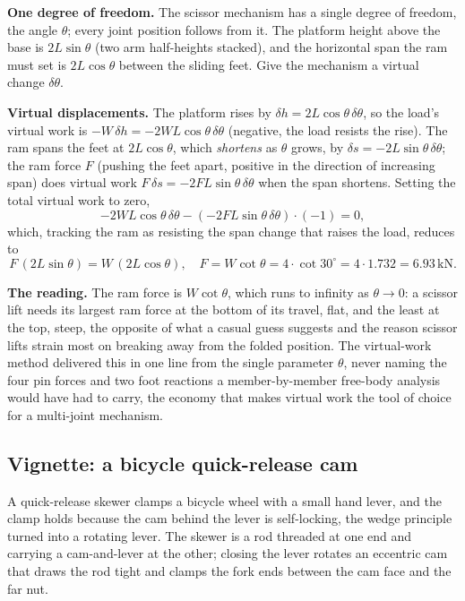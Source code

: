 \textbf{One degree of freedom.} The scissor mechanism has a single degree of
freedom, the angle $\theta$; every joint position follows from it. The
platform height above the base is $2L\sin\theta$ (two arm half-heights
stacked), and the horizontal span the ram must set is $2L\cos\theta$ between
the sliding feet. Give the mechanism a virtual change $\delta\theta$.

\textbf{Virtual displacements.} The platform rises by
$\delta h = 2L\cos\theta\,\delta\theta$, so the load's virtual work is
$-W\,\delta h = -2WL\cos\theta\,\delta\theta$ (negative, the load resists
the rise). The ram spans the feet at $2L\cos\theta$, which \emph{shortens}
as $\theta$ grows, by $\delta s = -2L\sin\theta\,\delta\theta$; the ram
force $F$ (pushing the feet apart, positive in the direction of increasing
span) does virtual work $F\,\delta s = -2FL\sin\theta\,\delta\theta$ when
the span shortens. Setting the total virtual work to zero,
\[
{-2WL\cos\theta}\,\delta\theta - ({-2FL\sin\theta}\,\delta\theta)\cdot(-1)
= 0,
\]
which, tracking the ram as resisting the span change that raises the load,
reduces to
\[
F\,(2L\sin\theta) = W\,(2L\cos\theta), \quad
F = W\cot\theta = 4\cdot\cot 30^\circ = 4\cdot 1.732 = 6.93\,\text{kN}.
\]

\textbf{The reading.} The ram force is $W\cot\theta$, which runs to infinity
as $\theta\to 0$: a scissor lift needs its largest ram force at the bottom
of its travel, flat, and the least at the top, steep, the opposite of what a
casual guess suggests and the reason scissor lifts strain most on breaking
away from the folded position. The virtual-work method delivered this in one
line from the single parameter $\theta$, never naming the four pin forces
and two foot reactions a member-by-member free-body analysis would have had
to carry, the economy that makes virtual work the tool of choice for a
multi-joint mechanism.

\subsection{Vignette: a bicycle quick-release cam}

A quick-release skewer clamps a bicycle wheel with a small hand lever, and
the clamp holds because the cam behind the lever is self-locking, the wedge
principle turned into a rotating lever. The skewer is a rod threaded at one
end and carrying a cam-and-lever at the other; closing the lever rotates an
eccentric cam that draws the rod tight and clamps the fork ends between the
cam face and the far nut.

